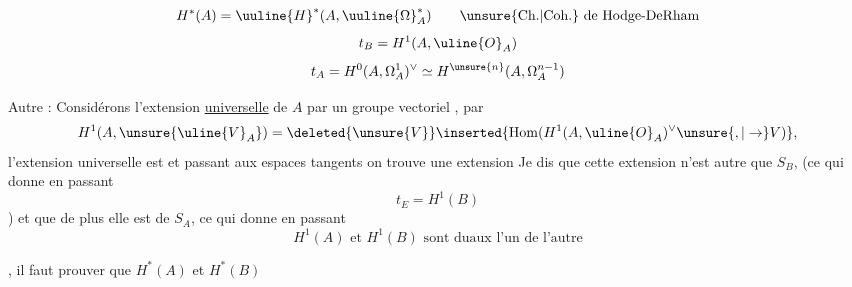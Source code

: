 
\[
H^*(A)=\uuline{H}^{*}(A,\uuline{\Omega}^{*}_{A})
\qquad \text{\unsure{Ch.|Coh.} de Hodge-DeRham}
\]
\[
t_B=H^1(A,\uline{O}_A)
\]
\[
t_A=H^0(A,\Omega_A^1)^\vee\simeq H^{\unsure{n}}(A,\Omega_A^{n-1})
\]


Autre  : Considérons l'extension \uline{universelle} de $A$ par un groupe vectoriel ,     par
\[
H^1(A,\unsure{\uline{V}_A})=\deleted{\unsure{V}}\inserted{\operatorname{Hom}(H^1(A,\uline{O}_A)^\vee\unsure{,|\to}V)},
\]
 l'extension universelle est
et passant aux espaces tangents on trouve une extension
Je dis que cette extension n'est autre que $S_B$, (ce qui donne en passant
\[
t_E=H^1(B)
\]
)
et que de plus elle est \uline{} de $S_A$, ce qui donne en passant
\[
\boxed{H^1(A)\text{ et }H^1(B)\text{ sont duaux l'un de l'autre}}
\]

, il faut prouver que $H^*(A)$ et $H^*(B)$

